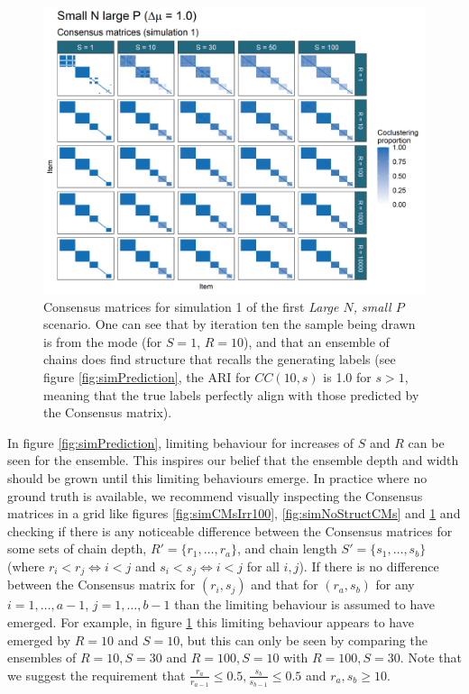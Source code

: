 \documentclass[]{article}
\begin{document}
\begin{figure} %
	\centering
	\includegraphics[scale=0.65]{./Images/Simulations/CMs/small_n_large_p_baseSim1.png}
	\caption{Consensus matrices for simulation 1 of the first \emph{Large $N$, small $P$} scenario. One can see that by iteration ten the sample being drawn is from the mode (for $S=1$, $R = 10$), and that an ensemble of chains does find structure that recalls the generating labels (see figure \ref{fig:simPrediction}, the ARI for $CC(10, s)$ is 1.0 for $s > 1$, meaning that the true labels perfectly align with those predicted by the Consensus matrix).}
	\label{fig:simSmallNLargePCMs}
\end{figure}

In figure \ref{fig:simPrediction}, limiting behaviour for increases of $S$ and $R$ can be seen for the ensemble. This inspires our belief that the ensemble depth and width should be grown until this limiting behaviours emerge. In practice where no ground truth is available, we recommend visually inspecting the Consensus matrices in a grid like figures \ref{fig:simCMsIrr100}, \ref{fig:simNoStructCMs} and \ref{fig:simSmallNLargePCMs} and checking if there is any noticeable difference between the Consensus matrices for some sets of chain depth, $R'=\{r_1, \ldots, r_a\}$, and chain length $S'=\{s_1, \ldots, s_b\}$ (where $r_i < r_j \iff i < j$ and $s_i < s_j \iff i < j$ for all $i, j$). If there is no difference between the Consensus matrix for $(r_i, s_j)$ and that for $(r_a, s_b)$ for any $i = 1, \ldots, a - 1$, $j = 1, \ldots, b - 1$ than the limiting behaviour is assumed to have emerged. For example, in figure \ref{fig:simSmallNLargePCMs} this limiting behaviour appears to have emerged by $R=10$ and $S=10$, but this can only be seen by comparing the ensembles of $R = 10, S = 30$ and $R=100, S = 10$ with $R= 100, S= 30$. Note that we suggest the requirement that $\frac{r_a}{r_{a - 1}} \leq 0.5, \frac{s_b}{s_{b-1}} \leq 0.5$ and $r_a, s_b \geq 10$.
\end{document}
